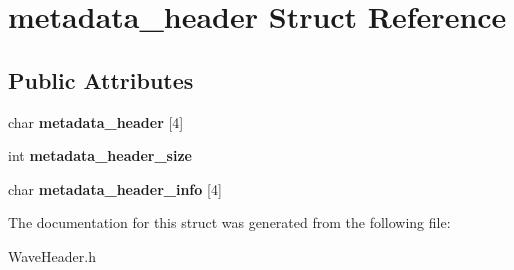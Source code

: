 \hypertarget{structmetadata__header}{}\section{metadata\+\_\+header Struct Reference}
\label{structmetadata__header}
\subsection*{Public Attributes}
\begin{DoxyCompactItemize}
\item 
\mbox{\label{structmetadata__header_ae79376f0ab4c3ef1be815dc51a4ad479}} 
char {\bfseries metadata\+\_\+header} \mbox{[}4\mbox{]}
\item 
\mbox{\label{structmetadata__header_a9e8db26863ddbec52db57a8c46c87875}} 
int {\bfseries metadata\+\_\+header\+\_\+size}
\item 
\mbox{\label{structmetadata__header_a8660929d9c6b99723f88e1de7d67426a}} 
char {\bfseries metadata\+\_\+header\+\_\+info} \mbox{[}4\mbox{]}
\end{DoxyCompactItemize}


The documentation for this struct was generated from the following file\+:\begin{DoxyCompactItemize}
\item 
Wave\+Header.\+h\end{DoxyCompactItemize}
